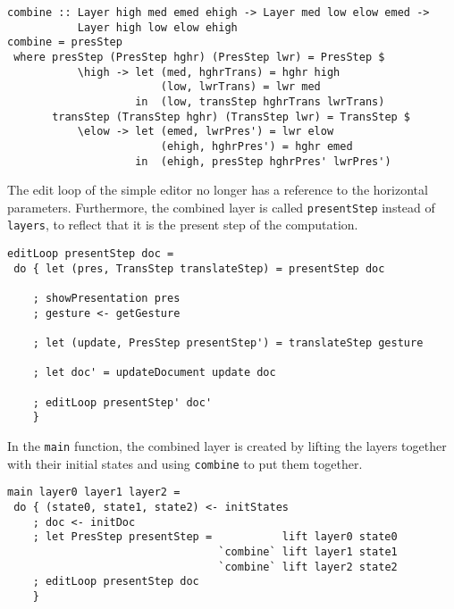 \begin{small}
\begin{verbatim}
combine :: Layer high med emed ehigh -> Layer med low elow emed -> 
           Layer high low elow ehigh
combine = presStep
 where presStep (PresStep hghr) (PresStep lwr) = PresStep $ 
           \high -> let (med, hghrTrans) = hghr high
                        (low, lwrTrans) = lwr med
                    in  (low, transStep hghrTrans lwrTrans)
       transStep (TransStep hghr) (TransStep lwr) = TransStep $
           \elow -> let (emed, lwrPres') = lwr elow
                        (ehigh, hghrPres') = hghr emed
                    in  (ehigh, presStep hghrPres' lwrPres') 
\end{verbatim}
\end{small}


The edit loop of the simple editor no longer has a reference to the horizontal parameters. Furthermore, the combined layer is called \texttt{presentStep} instead of \texttt{layers}, to reflect that it is the present step of the computation.

\begin{small}
\begin{verbatim}
editLoop presentStep doc = 
 do { let (pres, TransStep translateStep) = presentStep doc

    ; showPresentation pres
    ; gesture <- getGesture
    
    ; let (update, PresStep presentStep') = translateStep gesture
    
    ; let doc' = updateDocument update doc
    
    ; editLoop presentStep' doc'
    }
\end{verbatim}
\end{small}

In the \texttt{main} function, the combined layer is created by lifting the layers together with their initial states and using \texttt{combine} to put them together.

\begin{small}
\begin{verbatim}
main layer0 layer1 layer2 =
 do { (state0, state1, state2) <- initStates
    ; doc <- initDoc 
    ; let PresStep presentStep =           lift layer0 state0 
                                 `combine` lift layer1 state1
                                 `combine` lift layer2 state2
    ; editLoop presentStep doc
    }
\end{verbatim}
\end{small}


